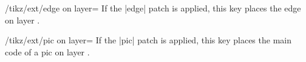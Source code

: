 \begin{multicols}{2}
\begin{key}{/tikz/ext/edge on layer=}
If the |edge| patch is applied, this key places the edge on layer .
\end{key}

\begin{key}{/tikz/ext/pic on layer=}
If the |pic| patch is applied, this key places the main code of a pic on layer .
\end{key}
\end{multicols}
\begin{codeexample}[width=.5\linewidth,preamble=\usetikzlibrary{ext.layers}]
\end{codeexample}